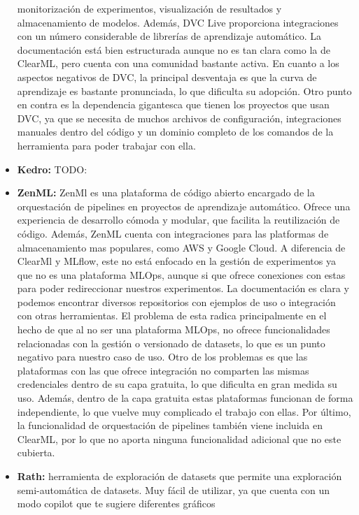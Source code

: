 \begin{itemize}
    monitorización de experimentos, visualización de resultados y almacenamiento de modelos. Además, 
    DVC Live proporciona integraciones con un número considerable de librerías de aprendizaje automático.
    La documentación está bien estructurada aunque no es tan clara como la de ClearML, pero cuenta con una
    comunidad bastante activa. En cuanto a los aspectos negativos de DVC, la principal desventaja es que
    la curva de aprendizaje es bastante pronunciada, lo que dificulta su adopción. Otro punto en contra
    es la dependencia gigantesca que tienen los proyectos que usan DVC, ya que se necesita de muchos archivos
    de configuración, integraciones manuales dentro del código y un dominio completo de los comandos de la
    herramienta para poder trabajar con ella.
    \item \textbf{Kedro:} TODO:
    \item \textbf{ZenML:} ZenMl es una plataforma de código abierto encargado de la orquestación de pipelines en
    proyectos de aprendizaje automático. Ofrece una experiencia de desarrollo cómoda y modular, que facilita
    la reutilización de código. Además, ZenML cuenta con integraciones para las platformas de almacenamiento
    mas populares, como AWS y Google Cloud. A diferencia de ClearMl y MLflow, este no está enfocado en la
    gestión de experimentos ya que no es una plataforma MLOps, aunque si que ofrece conexiones con estas
    para poder redireccionar nuestros experimentos. La documentación es clara y podemos encontrar diversos repositorios 
    con ejemplos de uso o integración con otras herramientas. El problema de esta radica principalmente
    en el hecho de que al no ser una plataforma MLOps, no ofrece funcionalidades relacionadas con la gestión
    o versionado de datasets, lo que es un punto negativo para nuestro caso de uso. Otro de los problemas
    es que las plataformas con las que ofrece integración no comparten las mismas credenciales dentro de su capa
    gratuita, lo que dificulta en gran medida su uso. Además, dentro de la capa gratuita estas plataformas 
    funcionan de forma independiente, lo que vuelve muy complicado el trabajo con ellas.
    Por último, la funcionalidad de orquestación de pipelines también viene incluida en ClearML, por lo que
    no aporta ninguna funcionalidad adicional que no este cubierta.
    \item \textbf{Rath:} herramienta de exploración de datasets que permite una exploración semi-automática
    de datasets. Muy fácil de utilizar, ya que cuenta con un modo copilot que te sugiere diferentes gráficos

\end{itemize}
